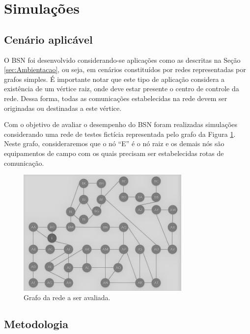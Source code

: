 \documentclass[12pt]{article}
\begin{document}
\section{Simulações}
\subsection{Cenário aplicável}
O BSN foi desenvolvido considerando-se aplicações como as descritas na Seção \ref{sec:Ambientacao}, ou seja, em cenários constituídos por redes representadas por grafos simples. É importante notar que este tipo de aplicação considera a existência de um vértice raiz, onde deve estar presente o centro de controle da rede. Dessa forma, todas as comunicações estabelecidas na rede devem ser originadas ou destinadas a este vértice.

Com o objetivo de avaliar o desempenho do BSN foram realizadas simulações considerando uma rede de testes fictícia representada pelo grafo da Figura \ref{fig_rede_estudo}. Neste grafo, consideraremos que o nó ``E'' é o nó raiz e os demais nós são equipamentos de campo com os quais precisam ser estabelecidas rotas de comunicação.

\begin{figure}[ht] %
	\centering
	\includegraphics[width=8.5cm]{Rede_Estudo_PB}
	\caption{Grafo da rede a ser avaliada.}
	\label{fig_rede_estudo}
\end{figure}

\subsection{Metodologia}
\end{document}
